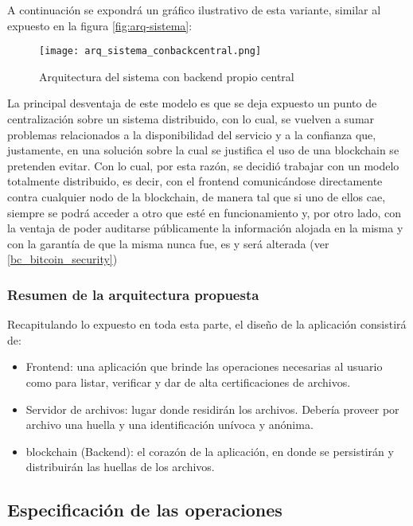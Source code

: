 A continuación se expondrá un gráfico ilustrativo de esta variante, similar al expuesto en la figura \ref{fig:arq-sistema}:

\begin{figure}[H]
  \texttt{[image: arq\_sistema\_conbackcentral.png]}
  \centering
  \caption{Arquitectura del sistema con backend propio central}
  \label{fig:arq-sistema-conbackcentral}
\end{figure}

La principal desventaja de este modelo es que se deja expuesto un punto de centralización sobre un sistema distribuido, con lo cual, se vuelven a sumar problemas relacionados a la disponibilidad del servicio y a la confianza que, justamente, en una solución sobre la cual se justifica el uso de una blockchain se pretenden evitar. Con lo cual, por esta razón, se decidió trabajar con un modelo totalmente distribuido, es decir, con el frontend comunicándose directamente contra cualquier nodo de la blockchain, de manera tal que si uno de ellos cae, siempre se podrá acceder a otro que esté en funcionamiento y, por otro lado, con la ventaja de poder auditarse públicamente la información alojada en la misma y con la garantía de que la misma nunca fue, es y será alterada (ver \ref{bc_bitcoin_security})

\subsubsection{Resumen de la arquitectura propuesta}
\label{Resumen de la arquitectura propuesta}

Recapitulando lo expuesto en toda esta parte, el diseño de la aplicación consistirá de:

\begin{itemize}
  \item Frontend: una aplicación que brinde las operaciones necesarias al usuario como para listar, verificar y dar de alta certificaciones de archivos.
  \item Servidor de archivos: lugar donde residirán los archivos. Debería proveer por archivo una huella y una identificación unívoca y anónima.
  \item blockchain (Backend): el corazón de la aplicación, en donde se persistirán y distribuirán las huellas de los archivos.
\end{itemize}

\subsection{Especificación de las operaciones}

